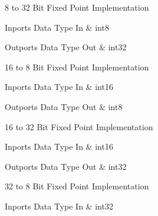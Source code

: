 \ifdefined \AddTestReports
{}
\fi
{}
\nopagebreak[0]

8 to 32 Bit Fixed Point Implementation

\begin{XtoCtabular}{Inports Data Type}
In & int8\tabularnewline
\hline
\end{XtoCtabular}

\begin{XtoCtabular}{Outports Data Type}
Out & int32\tabularnewline
\hline
\end{XtoCtabular}

\ifdefined \AddTestReports
{}
\fi
{}
\nopagebreak[0]

16 to 8 Bit Fixed Point Implementation

\begin{XtoCtabular}{Inports Data Type}
In & int16\tabularnewline
\hline
\end{XtoCtabular}

\begin{XtoCtabular}{Outports Data Type}
Out & int8\tabularnewline
\hline
\end{XtoCtabular}

\ifdefined \AddTestReports
{}
\fi
{}
\nopagebreak[0]

16 to 32 Bit Fixed Point Implementation

\begin{XtoCtabular}{Inports Data Type}
In & int16\tabularnewline
\hline
\end{XtoCtabular}

\begin{XtoCtabular}{Outports Data Type}
Out & int32\tabularnewline
\hline
\end{XtoCtabular}

\ifdefined \AddTestReports
{}
\fi
{}
\nopagebreak[0]

32 to 8 Bit Fixed Point Implementation

\begin{XtoCtabular}{Inports Data Type}
In & int32\tabularnewline
\hline
\end{XtoCtabular}

